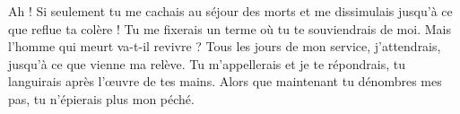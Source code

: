 \lettrine{A}{}h ! Si seulement tu me cachais au séjour des morts et me dissimulais jusqu’à ce que reflue ta colère ! Tu me fixerais un terme où tu te souviendrais de moi.
Mais l’homme qui meurt va-t-il revivre ? Tous les jours de mon service, j’attendrais, jusqu’à ce que vienne ma relève.
Tu m’appellerais et je te répondrais, tu languirais après l’œuvre de tes mains.
Alors que maintenant tu dénombres mes pas, tu n’épierais plus mon péché.